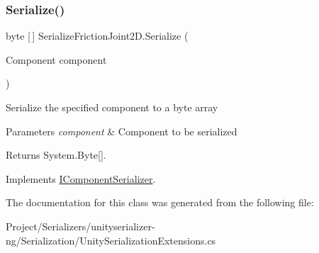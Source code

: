 \subsubsection{\texorpdfstring{Serialize()}{Serialize()}}
{\footnotesize\ttfamily byte \mbox{[}$\,$\mbox{]} Serialize\+Friction\+Joint2\+D.\+Serialize (\begin{DoxyParamCaption}\item[{Component}]{component }\end{DoxyParamCaption})\hspace{0.3cm}{\ttfamily [inline]}}



Serialize the specified component to a byte array 


\begin{DoxyParams}{Parameters}
{\em component} & Component to be serialized\\
\hline
\end{DoxyParams}
\begin{DoxyReturn}{Returns}
System.\+Byte\mbox{[}\mbox{]}.
\end{DoxyReturn}


Implements \hyperlink{interface_i_component_serializer_ab2aa38005665496b62d6c54b5f0dbd31}{I\+Component\+Serializer}.



The documentation for this class was generated from the following file\+:\begin{DoxyCompactItemize}
\item 
Project/\+Serializers/unityserializer-\/ng/\+Serialization/Unity\+Serialization\+Extensions.\+cs\end{DoxyCompactItemize}
